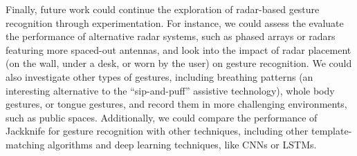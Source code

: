 Finally, future work could continue the exploration of radar-based gesture recognition through experimentation.
%
For instance, we could assess the evaluate the performance of alternative radar systems, such as phased arrays or radars featuring more spaced-out antennas, and look into the impact of radar placement (\eg on the wall, under a desk, or worn by the user) on gesture recognition.
%
We could also investigate other types of gestures, including breathing patterns (an interesting alternative to the ``sip-and-puff'' assistive technology), whole body gestures, or tongue gestures, and record them in more challenging environments, such as public spaces.
%
Additionally, we could compare the performance of Jackknife for gesture recognition with other techniques, including other template-matching algorithms and deep learning techniques, like CNNs or LSTMs.